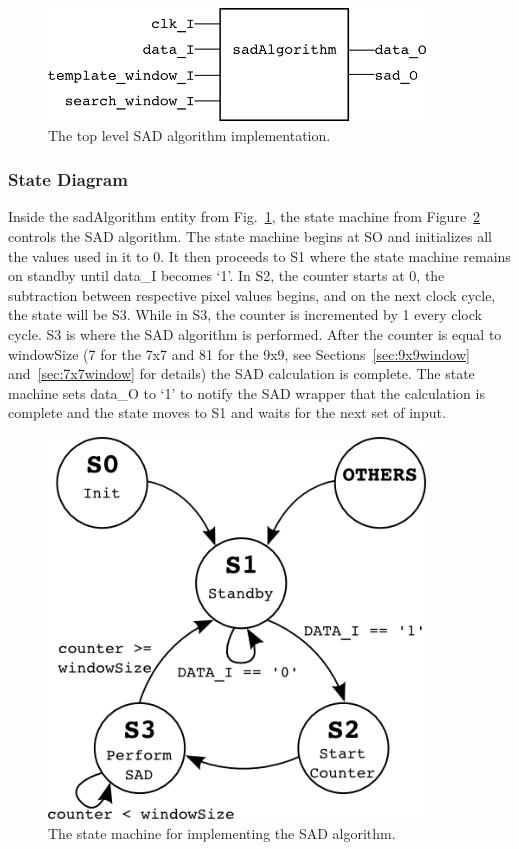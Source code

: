 \begin{figure}[h]
	\begin{center}
		\includegraphics[width=100mm]{figures/sadAlgorithm_rtl.png}
		\captionfonts
		\caption{The top level SAD algorithm implementation.}
		\label{fig:sadAlg_rtl}
	\end{center}
\end{figure}

\subsubsection{State Diagram}

Inside the sadAlgorithm entity from Fig.~\ref{fig:sadAlg_rtl}, the state machine from Figure~\ref{fig:stateMachine} controls the SAD algorithm. The state machine begins at SO and initializes all the values used in it to 0. It then proceeds to S1 where the state machine remains on standby until data\_I becomes `1'. In S2, the counter starts at 0, the subtraction between respective pixel values begins, and on the next clock cycle, the state will be S3. While in S3, the counter is incremented by 1 every clock cycle. S3 is where the SAD algorithm is performed. After the counter is equal to windowSize (7 for the 7x7 and 81 for the 9x9, see Sections~\ref{sec:9x9window} and~\ref{sec:7x7window} for details) the SAD calculation is complete. The state machine sets data\_O to `1' to notify the SAD wrapper that the calculation is complete and the state moves to S1 and waits for the next set of input.

\begin{figure}[h]
	\begin{center}
		\includegraphics[width=100mm]{figures/stateMachine.png}
		\captionfonts
		\caption{The state machine for implementing the SAD algorithm.}
		\label{fig:stateMachine}
	\end{center}
\end{figure}

